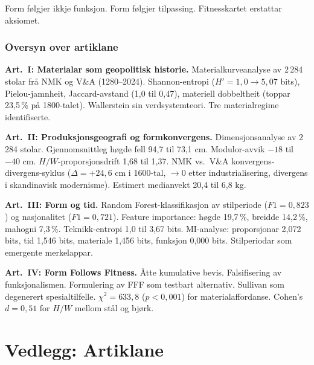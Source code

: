 \documentclass[10pt, a4paper, twocolumn]{article}
\begin{document}
Form følgjer ikkje funksjon. Form følgjer tilpassing. Fitnesskartet erstattar aksiomet.


\section*{Oversyn over artiklane}

\noindent\textbf{Art.~I: Materialar som geopolitisk historie.} Materialkurveanalyse av 2\,284 stolar frå NMK og V\&A (1280--2024). Shannon-entropi ($H' = 1{,}0 \rightarrow 5{,}07$ bits), Pielou-jamnheit, Jaccard-avstand (1,0 til 0,47), materiell dobbeltheit (toppar 23,5\,\% på 1800-talet). Wallerstein sin verdsystemteori. Tre materialregime identifiserte.

\medskip
\noindent\textbf{Art.~II: Produksjonsgeografi og formkonvergens.} Dimensjonsanalyse av 2\,284 stolar. Gjennomsnittleg høgde fell 94,7 til 73,1 cm. Modulor-avvik $-18$ til $-40$ cm. $H/W$-proporsjonsdrift 1,68 til 1,37. NMK vs.\ V\&A konvergens-divergens-syklus ($\Delta = +24{,}6$ cm i 1600-tal, $\rightarrow 0$ etter industrialisering, divergens i skandinavisk modernisme). Estimert medianvekt 20,4 til 6,8 kg.

\medskip
\noindent\textbf{Art.~III: Form og tid.} Random Forest-klassifikasjon av stilperiode ($F1 = 0{,}823$) og nasjonalitet ($F1 = 0{,}721$). Feature importance: høgde 19,7\,\%, breidde 14,2\,\%, mahogni 7,3\,\%. Teknikk-entropi 1,0 til 3,67 bits. MI-analyse: proporsjonar 2,072 bits, tid 1,546 bits, materiale 1,456 bits, funksjon 0,000 bits. Stilperiodar som emergente merkelappar.

\medskip
\noindent\textbf{Art.~IV: Form Follows Fitness.} Åtte kumulative bevis. Falsifisering av funksjonalismen. Formulering av FFF som testbart alternativ. Sullivan som degenerert spesialtilfelle. $\chi^2 = 633{,}8$ ($p < 0{,}001$) for materialaffordanse. Cohen's $d = 0{,}51$ for $H/W$ mellom stål og bjørk.


\newpage
\onecolumn



\newpage
\part*{Vedlegg: Artiklane}







\end{document}
